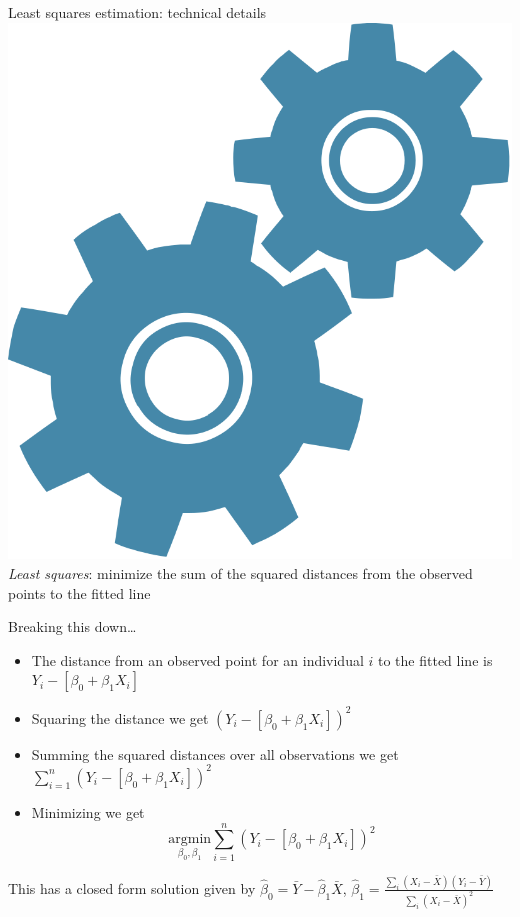 \documentclass[10pt,t]{beamer}
\begin{document}
\begin{frame}{Least squares estimation: technical details \includegraphics[scale=0.02]{technical}}
\textit{Least squares}: minimize the sum of the squared distances from the observed points to the fitted line

\vspace{0.3cm}

Breaking this down\dots

\vspace{0.3cm}

\begin{itemize}
	\item The distance from an observed point for an individual $i$ to the fitted line is $Y_i - [\beta_0 + \beta_1 X_i]$
	\item Squaring the distance we get $(Y_i - [\beta_0 + \beta_1 X_i])^2$
	\item Summing the squared distances over all observations we get $\sum_{i = 1}^n (Y_i - [\beta_0 + \beta_1 X_i])^2$
	\item Minimizing we get $$\underset{\beta_0, \beta_1}{\text{argmin}} \sum_{i = 1}^n (Y_i - [\beta_0 + \beta_1 X_i])^2$$
\end{itemize}

\vspace{0.3cm}

\small This has a closed form solution given by $\hat{\beta}_0 =  \bar{Y} - \hat{\beta}_1 \bar{X}$, $\hat{\beta}_1 = \frac{\sum_i (X_i - \bar{X}) (Y_i - \bar{Y})}{\sum_i (X_i - \bar{X})^2}$

\end{frame}
\end{document}
